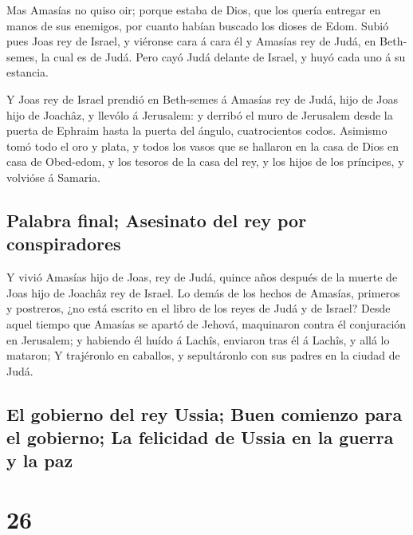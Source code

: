  Mas Amasías no quiso oir; porque estaba de Dios, que los
quería entregar en manos de sus enemigos, por cuanto habían buscado los
dioses de Edom.  Subió pues Joas rey de Israel, y
viéronse cara á cara él y Amasías rey de Judá, en Beth-semes, la cual es
de Judá.  Pero cayó Judá delante de Israel, y huyó cada
uno á su estancia.

 Y Joas rey de Israel prendió en Beth-semes á Amasías rey
de Judá, hijo de Joas hijo de Joachâz, y llevólo á Jerusalem: y derribó
el muro de Jerusalem desde la puerta de Ephraim hasta la puerta del
ángulo, cuatrocientos codos.  Asimismo tomó todo el oro y
plata, y todos los vasos que se hallaron en la casa de Dios en casa de
Obed-edom, y los tesoros de la casa del rey, y los hijos de los
príncipes, y volvióse á Samaria.

\hypertarget{palabra-final-asesinato-del-rey-por-conspiradores}{%
\subsection{Palabra final; Asesinato del rey por
conspiradores}\label{palabra-final-asesinato-del-rey-por-conspiradores}}

 Y vivió Amasías hijo de Joas, rey de Judá, quince años
después de la muerte de Joas hijo de Joachâz rey de Israel.
 Lo demás de los hechos de Amasías, primeros y postreros,
¿no está escrito en el libro de los reyes de Judá y de Israel?
 Desde aquel tiempo que Amasías se apartó de Jehová,
maquinaron contra él conjuración en Jerusalem; y habiendo él huído á
Lachîs, enviaron tras él á Lachîs, y allá lo mataron;  Y
trajéronlo en caballos, y sepultáronlo con sus padres en la ciudad de
Judá.

\hypertarget{el-gobierno-del-rey-ussia-buen-comienzo-para-el-gobierno-la-felicidad-de-ussia-en-la-guerra-y-la-paz}{%
\subsection{El gobierno del rey Ussia; Buen comienzo para el gobierno;
La felicidad de Ussia en la guerra y la
paz}\label{el-gobierno-del-rey-ussia-buen-comienzo-para-el-gobierno-la-felicidad-de-ussia-en-la-guerra-y-la-paz}}

\hypertarget{section-14-26}{%
\section{26}\label{section-14-26}}

